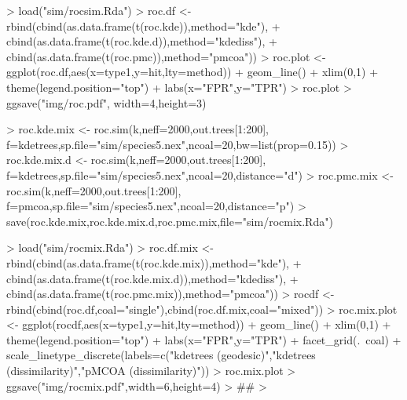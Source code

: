 \documentclass{article}
\begin{document}
\begin{Schunk}
\begin{Sinput}
> load("sim/rocsim.Rda")
> roc.df <- rbind(cbind(as.data.frame(t(roc.kde)),method="kde"),
+                 cbind(as.data.frame(t(roc.kde.d)),method="kdediss"),
+                 cbind(as.data.frame(t(roc.pmc)),method="pmcoa"))
> roc.plot <- ggplot(roc.df,aes(x=type1,y=hit,lty=method)) + geom_line() + xlim(0,1) + theme(legend.position="top") + labs(x="FPR",y="TPR")
> roc.plot
> ggsave("img/roc.pdf", width=4,height=3)
\end{Sinput}
\end{Schunk}



\begin{Schunk}
\begin{Sinput}
> roc.kde.mix <- roc.sim(k,neff=2000,out.trees[1:200], f=kdetrees,sp.file="sim/species5.nex",ncoal=20,bw=list(prop=0.15))
> roc.kde.mix.d <- roc.sim(k,neff=2000,out.trees[1:200], f=kdetrees,sp.file="sim/species5.nex",ncoal=20,distance="d")
> roc.pmc.mix <- roc.sim(k,neff=2000,out.trees[1:200], f=pmcoa,sp.file="sim/species5.nex",ncoal=20,distance="p")
> save(roc.kde.mix,roc.kde.mix.d,roc.pmc.mix,file="sim/rocmix.Rda")
\end{Sinput}
\end{Schunk}
\begin{Schunk}
\begin{Sinput}
> load("sim/rocmix.Rda")
> roc.df.mix <- rbind(cbind(as.data.frame(t(roc.kde.mix)),method="kde"), 
+                     cbind(as.data.frame(t(roc.kde.mix.d)),method="kdediss"),
+                     cbind(as.data.frame(t(roc.pmc.mix)),method="pmcoa"))
> rocdf <- rbind(cbind(roc.df,coal="single"),cbind(roc.df.mix,coal="mixed"))
> roc.mix.plot <- ggplot(rocdf,aes(x=type1,y=hit,lty=method)) + geom_line() + xlim(0,1) + theme(legend.position="top") + labs(x="FPR",y="TPR") + facet_grid(.~coal) + scale_linetype_discrete(labels=c("kdetrees (geodesic)","kdetrees (dissimilarity)","pMCOA (dissimilarity)"))
> roc.mix.plot
> ggsave("img/rocmix.pdf",width=6,height=4)
>  ##
> 
\end{Sinput}
\end{Schunk}
\end{document}
